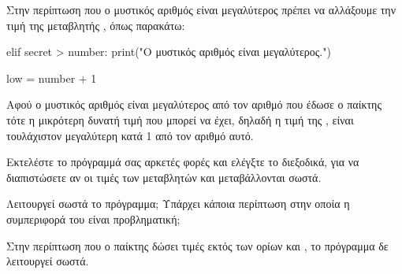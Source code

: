 \documentclass[a4paper,11pt,oneside]{book}
\begin{document}
\begin{step}
\begin{answer}
Στην περίπτωση που ο μυστικός αριθμός είναι μεγαλύτερος πρέπει να αλλάξουμε την τιμή της μεταβλητής , όπως παρακάτω:
	
\begin{pyplain}
    elif secret > number:
        print("Ο μυστικός αριθμός είναι μεγαλύτερος.")
\end{pyplain}
\begin{pynew}
        low = number + 1
\end{pynew}

Αφού ο μυστικός αριθμός είναι μεγαλύτερος από τον αριθμό που έδωσε ο παίκτης τότε η μικρότερη δυνατή τιμή που μπορεί να έχει, δηλαδή η τιμή της , είναι τουλάχιστον μεγαλύτερη κατά 1 από τον αριθμό αυτό.
\end{answer}
\end{step}

\begin{step}
Εκτελέστε το πρόγραμμά σας αρκετές φορές και ελέγξτε το διεξοδικά, για να διαπιστώσετε αν οι τιμές των μεταβλητών  και  μεταβάλλονται σωστά.

Λειτουργεί σωστά το πρόγραμμα; Υπάρχει κάποια περίπτωση στην οποία η συμπεριφορά του είναι προβληματική; 

\begin{answer}
Στην περίπτωση που ο παίκτης δώσει τιμές εκτός των ορίων  και , το πρόγραμμα δε λειτουργεί σωστά.
\end{answer}
\end{step}
\end{document}
